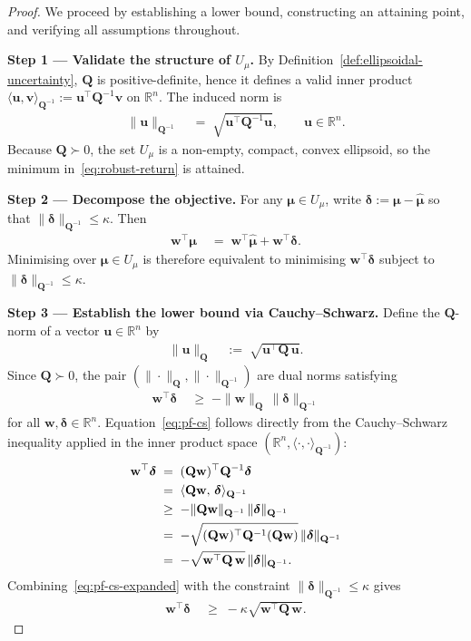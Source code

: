 \documentclass[12pt,openany]{book}
\newcommand{\R}{\mathbb{R}}
\newcommand{\bfw}{\mathbf{w}}
\newcommand{\bfmu}{\boldsymbol{\mu}}
\newcommand{\bfQ}{\mathbf{Q}}
\newcommand{\bfdelta}{\boldsymbol{\delta}}
\newcommand{\bfu}{\mathbf{u}}
\newcommand{\bfv}{\mathbf{v}}
\newcommand{\calU}{\mathcal{U}}
\numberwithin{equation}{chapter}
\theoremstyle{plain}
\theoremstyle{definition}
\theoremstyle{remark}
\numberwithin{equation}{chapter}
\theoremstyle{plain}
\def\calU{U}%
\begin{document}
\begin{proof}
We proceed by establishing a lower bound, constructing an attaining
point, and verifying all assumptions throughout.

\medskip
\noindent\textbf{Step 1 — Validate the structure of $\calU_\mu$.}
By Definition~\ref{def:ellipsoidal-uncertainty}, $\bfQ$ is
positive-definite, hence it defines a valid inner product
$\langle \bfu, \bfv \rangle_{\bfQ^{-1}} := \bfu^\top \bfQ^{-1} \bfv$
on $\R^n$.  The induced norm is
\begin{align}
  \|\bfu\|_{\bfQ^{-1}}
  &\;=\; \sqrt{\bfu^\top \bfQ^{-1} \bfu}, \qquad \bfu \in \R^n.
  \label{eq:pf-norm-Qinv}
\end{align}
Because $\bfQ \succ 0$, the set $\calU_\mu$ is a non-empty, compact,
convex ellipsoid, so the minimum in~\eqref{eq:robust-return} is
attained.

\medskip
\noindent\textbf{Step 2 — Decompose the objective.}
For any $\bfmu \in \calU_\mu$, write $\bfdelta := \bfmu - \hat{\bfmu}$
so that $\|\bfdelta\|_{\bfQ^{-1}} \leq \kappa$.  Then
\begin{align}
  \bfw^\top \bfmu
  &\;=\; \bfw^\top\hat{\bfmu} + \bfw^\top\bfdelta.
  \label{eq:pf-decomp}
\end{align}
Minimising over $\bfmu \in \calU_\mu$ is therefore equivalent to
minimising $\bfw^\top\bfdelta$ subject to
$\|\bfdelta\|_{\bfQ^{-1}} \leq \kappa$.

\medskip
\noindent\textbf{Step 3 — Establish the lower bound via
Cauchy--Schwarz.}
Define the $\bfQ$-norm of a vector $\bfu \in \R^n$ by
\begin{align}
  \|\bfu\|_{\bfQ}
  &\;:=\; \sqrt{\bfu^\top \bfQ\, \bfu}.
  \label{eq:pf-Qnorm}
\end{align}
Since $\bfQ \succ 0$, the pair $(\|\cdot\|_{\bfQ},\|\cdot\|_{\bfQ^{-1}})$
are dual norms satisfying
\begin{align}
  \bfw^\top \bfdelta
  &\;\geq\; -\|\bfw\|_{\bfQ}\,\|\bfdelta\|_{\bfQ^{-1}}
  \label{eq:pf-cs}
\end{align}
for all $\bfw, \bfdelta \in \R^n$.
Equation~\eqref{eq:pf-cs} follows directly from the
Cauchy--Schwarz inequality applied in the inner product space
$(\R^n, \langle\cdot,\cdot\rangle_{\bfQ^{-1}})$:
\begin{align}
  \bfw^\top \bfdelta
  &\;=\;
  (\bfQ\bfw)^\top \bfQ^{-1} \bfdelta \notag\\
  &\;=\;
  \langle \bfQ\bfw,\, \bfdelta \rangle_{\bfQ^{-1}} \notag\\
  &\;\geq\;
  -\|\bfQ\bfw\|_{\bfQ^{-1}}\,\|\bfdelta\|_{\bfQ^{-1}} \notag\\
  &\;=\;
  -\sqrt{(\bfQ\bfw)^\top \bfQ^{-1} (\bfQ\bfw)}\,
    \|\bfdelta\|_{\bfQ^{-1}} \notag\\
  &\;=\;
  -\sqrt{\bfw^\top \bfQ\, \bfw}\,\|\bfdelta\|_{\bfQ^{-1}}.
  \label{eq:pf-cs-expanded}
\end{align}
Combining~\eqref{eq:pf-cs-expanded} with the constraint
$\|\bfdelta\|_{\bfQ^{-1}} \leq \kappa$ gives
\begin{align}
  \bfw^\top \bfdelta
  &\;\geq\; -\kappa\sqrt{\bfw^\top \bfQ\, \bfw}.
  \label{eq:pf-lb}
\end{align}


\end{proof}
\end{document}
